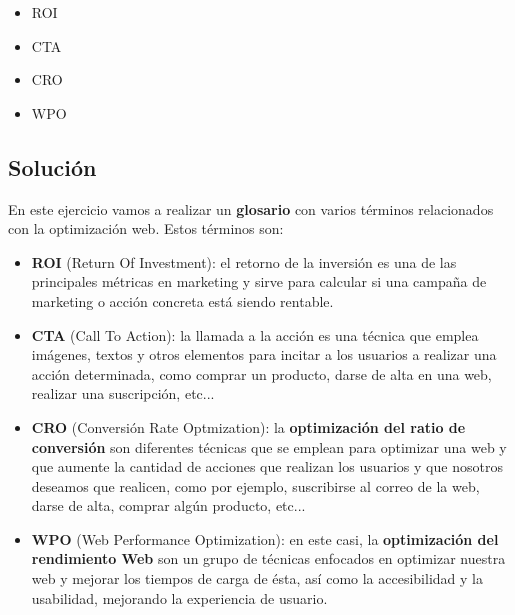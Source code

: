 \begin{itemize}
    \item ROI
    \item CTA
    \item CRO
    \item WPO
\end{itemize}

\subsection{Solución}
En este ejercicio vamos a realizar un \textbf{glosario} con varios términos relacionados con la optimización web. Estos términos son:

\begin{itemize}
    \item \textbf{ROI} (Return Of Investment): el retorno de la inversión es una de las principales métricas en marketing y sirve para calcular si una campaña de marketing o acción concreta está siendo rentable.

    \item \textbf{CTA} (Call To Action): la llamada a la acción es una técnica que emplea imágenes, textos y otros elementos para incitar a los usuarios a realizar una acción determinada, como comprar un producto, darse de alta en una web, realizar una suscripción, etc...

    \item \textbf{CRO} (Conversión Rate Optmization): la \textbf{optimización del ratio de conversión} son diferentes técnicas que se emplean para optimizar una web y que aumente la cantidad de acciones que realizan los usuarios y que nosotros deseamos que realicen, como por ejemplo, suscribirse al correo de la web, darse de alta, comprar algún producto, etc...

    \item \textbf{WPO} (Web Performance Optimization): en este casi, la \textbf{optimización del rendimiento Web} son un grupo de técnicas enfocados en optimizar nuestra web y mejorar los tiempos de carga de ésta, así como la accesibilidad y la usabilidad, mejorando la experiencia de usuario.
\end{itemize}

